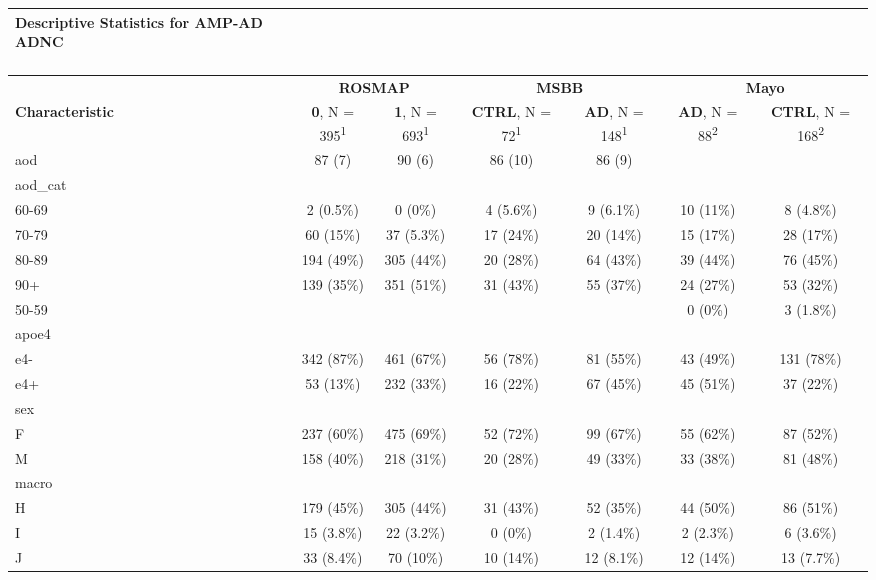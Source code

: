\documentclass[]{book}
\begin{document}
\captionsetup[table]{labelformat=empty,skip=1pt}
\begin{longtable}{lcccccc}
\caption*{
\large Descriptive Statistics for AMP-AD ADNC\\ 
\small \\ 
} \\ 
\toprule
& \multicolumn{2}{c}{\textbf{ROSMAP}} & \multicolumn{2}{c}{\textbf{MSBB}} & \multicolumn{2}{c}{\textbf{Mayo}} \\ 
 \cmidrule(lr){2-3}\cmidrule(lr){4-5}\cmidrule(lr){6-7}
\textbf{Characteristic} & \textbf{0}, N = 395\textsuperscript{1} & \textbf{1}, N = 693\textsuperscript{1} & \textbf{CTRL}, N = 72\textsuperscript{1} & \textbf{AD}, N = 148\textsuperscript{1} & \textbf{AD}, N = 88\textsuperscript{2} & \textbf{CTRL}, N = 168\textsuperscript{2} \\ 
\midrule
aod & 87 (7) & 90 (6) & 86 (10) & 86 (9) &  &  \\ 
aod\_cat &  &  &  &  &  &  \\ 
60-69 & 2 (0.5\%) & 0 (0\%) & 4 (5.6\%) & 9 (6.1\%) & 10 (11\%) & 8 (4.8\%) \\ 
70-79 & 60 (15\%) & 37 (5.3\%) & 17 (24\%) & 20 (14\%) & 15 (17\%) & 28 (17\%) \\ 
80-89 & 194 (49\%) & 305 (44\%) & 20 (28\%) & 64 (43\%) & 39 (44\%) & 76 (45\%) \\ 
90+ & 139 (35\%) & 351 (51\%) & 31 (43\%) & 55 (37\%) & 24 (27\%) & 53 (32\%) \\ 
50-59 &  &  &  &  & 0 (0\%) & 3 (1.8\%) \\ 
apoe4 &  &  &  &  &  &  \\ 
e4- & 342 (87\%) & 461 (67\%) & 56 (78\%) & 81 (55\%) & 43 (49\%) & 131 (78\%) \\ 
e4+ & 53 (13\%) & 232 (33\%) & 16 (22\%) & 67 (45\%) & 45 (51\%) & 37 (22\%) \\ 
sex &  &  &  &  &  &  \\ 
F & 237 (60\%) & 475 (69\%) & 52 (72\%) & 99 (67\%) & 55 (62\%) & 87 (52\%) \\ 
M & 158 (40\%) & 218 (31\%) & 20 (28\%) & 49 (33\%) & 33 (38\%) & 81 (48\%) \\ 
macro &  &  &  &  &  &  \\ 
H & 179 (45\%) & 305 (44\%) & 31 (43\%) & 52 (35\%) & 44 (50\%) & 86 (51\%) \\ 
I & 15 (3.8\%) & 22 (3.2\%) & 0 (0\%) & 2 (1.4\%) & 2 (2.3\%) & 6 (3.6\%) \\ 
J & 33 (8.4\%) & 70 (10\%) & 10 (14\%) & 12 (8.1\%) & 12 (14\%) & 13 (7.7\%) \\ 

\end{longtable}
\end{document}
